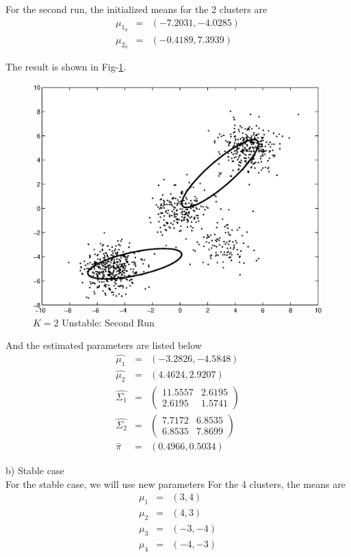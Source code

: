 \documentclass[12pt]{article}
\begin{document}
For the second run, the initialized means for the 2 clusters are
\begin{eqnarray*}
\mu_{1_0} &=& (-7.2031,   -4.0285) \\
\mu_{2_0} &=& (-0.4189,    7.3939)
\end{eqnarray*}

The result is shown in Fig-\ref{fig:c3-2}. \\

\begin{figure}[ht!]
  \centering
  \includegraphics[width=0.7 \textwidth]{c3-2}
  \caption{$K = 2$ Unstable: Second Run \label{fig:c3-2}}
\end{figure}

And the estimated parameters are listed below
\begin{eqnarray*}
\hat{\mu_1} &=& (-3.2826,   -4.5848) \\
\hat{\mu_2} &=& (4.4624,    2.9207) \\
\hat{\Sigma_1} &=&
  \begin{pmatrix}
   11.5557  &  2.6195 \\
    2.6195  &  1.5741
  \end{pmatrix} \\
\hat{\Sigma_2} &=& 
  \begin{pmatrix}
    7.7172  &  6.8535 \\
    6.8535  &  7.8699
  \end{pmatrix} \\
\hat{\pi} &=& (0.4966, 0.5034)
\end{eqnarray*}

b) Stable case \\

For the stable case, we will use new parameters
For the 4 clusters, the means are
\begin{eqnarray*}
  \mu_1 &=& (3, 4) \\
  \mu_2 &=& (4, 3) \\
  \mu_3 &=& (-3, -4) \\
  \mu_4 &=& (-4, -3)
\end{eqnarray*}
\end{document}
